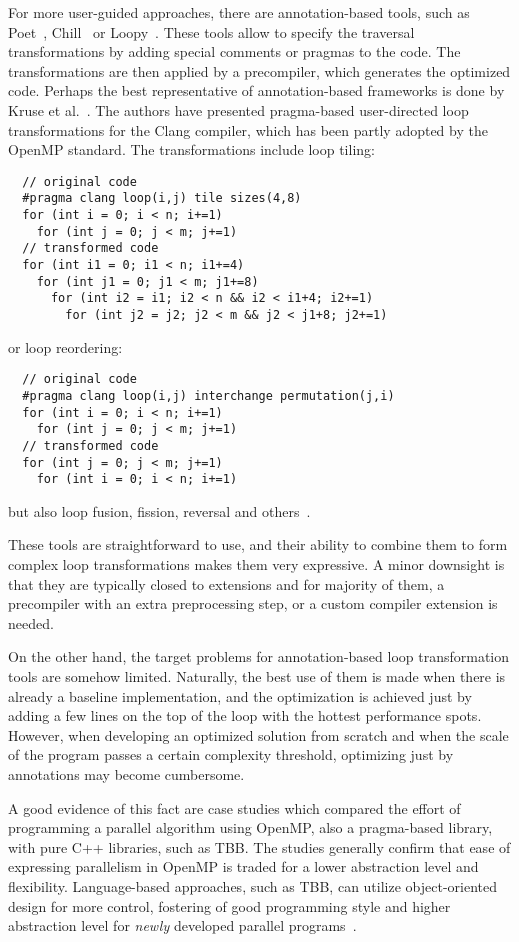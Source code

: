 For more user-guided approaches, there are annotation-based tools, such as Poet~\cite{yi2007poet}, Chill~\cite{chen2008chill} or Loopy~\cite{namjoshi2016loopy}. These tools allow to specify the traversal transformations by adding special comments or pragmas to the code. The transformations are then applied by a precompiler, which generates the optimized code. Perhaps the best representative of annotation-based frameworks is done by Kruse et al.~\cite{kruse2018user}. The authors have presented pragma-based user-directed loop transformations for the Clang compiler, which has been partly adopted by the OpenMP standard. The transformations include loop tiling:
\begin{verbatim}
  // original code
  #pragma clang loop(i,j) tile sizes(4,8)
  for (int i = 0; i < n; i+=1)
    for (int j = 0; j < m; j+=1)
  // transformed code
  for (int i1 = 0; i1 < n; i1+=4)
    for (int j1 = 0; j1 < m; j1+=8)
      for (int i2 = i1; i2 < n && i2 < i1+4; i2+=1)
        for (int j2 = j2; j2 < m && j2 < j1+8; j2+=1)
\end{verbatim}
or loop reordering:
\begin{verbatim}
  // original code
  #pragma clang loop(i,j) interchange permutation(j,i)
  for (int i = 0; i < n; i+=1)
    for (int j = 0; j < m; j+=1)
  // transformed code
  for (int j = 0; j < m; j+=1)
    for (int i = 0; i < n; i+=1)
\end{verbatim}
but also loop fusion, fission, reversal and others~\cite{mckinley1996improving}. 

These tools are straightforward to use, and their ability to combine them to form complex loop transformations makes them very expressive. A minor downsight is that they are typically closed to extensions and for majority of them, a precompiler with an extra preprocessing step, or a custom compiler extension is needed.

On the other hand, the target problems for annotation-based loop transformation tools are somehow limited. Naturally, the best use of them is made when there is already a baseline implementation, and the optimization is achieved just by adding a few lines on the top of the loop with the hottest performance spots. However, when developing an optimized solution from scratch and when the scale of the program passes a certain complexity threshold, optimizing just by annotations may become cumbersome. 

A good evidence of this fact are case studies which compared the effort of programming a parallel algorithm using OpenMP, also a pragma-based library, with pure C++ libraries, such as TBB. The studies generally confirm that ease of expressing parallelism in OpenMP is traded for a lower abstraction level and flexibility. Language-based approaches, such as TBB, can utilize object-oriented design for more control, fostering of good programming style and higher abstraction level for \emph{newly} developed parallel programs~\cite{kegel2009using,ajkunic2012comparison,refsnes2011comparison}.

